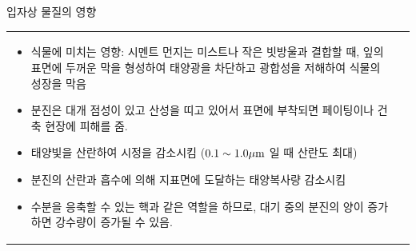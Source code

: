 \begin{frame}[t]{입자상 물질의 영향}
	\begin{tabular}{ll}
		\begin{minipage}[t]{0.475\textwidth}\scriptsize
			\begin{itemize}			
				\item 식물에 미치는 영향: 시멘트 먼지는 미스트나 작은 빗방울과 결합할 때, 잎의 표면에 두꺼운 막을 형성하여 태양광을 차단하고 광합성을 저해하여 식물의 성장을 막음							
				\item 분진은 대개 점성이 있고 산성을 띠고 있어서 표면에 부착되면 페이팅이나 건축 현장에 피해를 줌.
				\item 태양빛을 산란하여 시정을 감소시킴 ($0.1 \sim 1.0 \rm {\mu m}$ 일 때 산란도 최대)
				\item 분진의 산란과 흡수에 의해 지표면에 도달하는 태양복사량 감소시킴
				\item 수분을 응축할 수 있는 핵과 같은 역할을 하므로, 대기 중의 분진의 양이 증가하면 강수량이 증가될 수 있음.
			\end{itemize}

		\end{minipage}	
		&
		\begin{minipage}[t]{0.475\textwidth} \scriptsize	
			
		\end{minipage}
	\end{tabular}
\end{frame}




